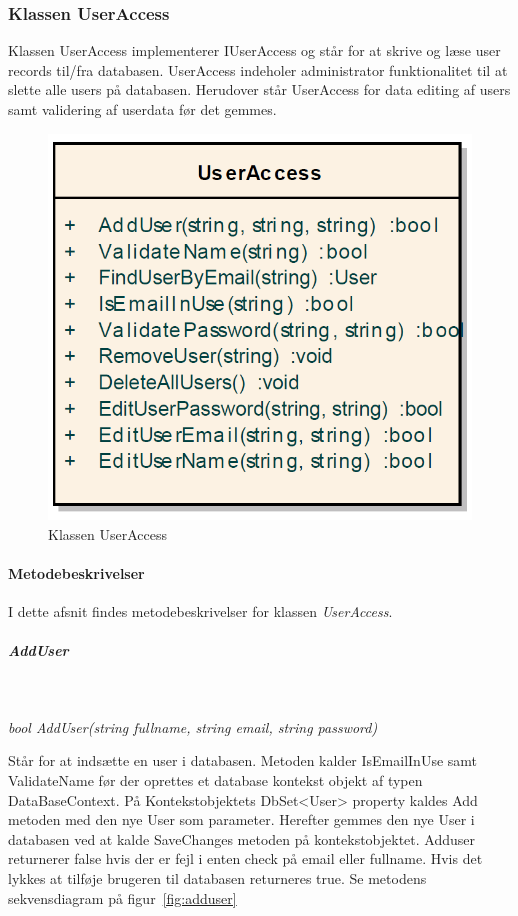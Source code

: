 \subsubsection{Klassen UserAccess}
Klassen UserAccess implementerer IUserAccess og står for at skrive og læse user records til/fra databasen.
UserAccess indeholer administrator funktionalitet til at slette alle users på databasen. Herudover står UserAccess for data editing af users samt validering af userdata før det gemmes.

\begin{figure}
\centering
\includegraphics[width=0.4\linewidth]{figs/implementering/UserAccessClass.PNG}
\caption{Klassen UserAccess}
\label{fig:UserAccessClass}
\end{figure}


\paragraph{Metodebeskrivelser}
I dette afsnit findes metodebeskrivelser for klassen \textit{UserAccess}.

\subparagraph{AddUser}\

\textit{bool AddUser(string fullname, string email, string password)}

Står for at indsætte en user i databasen. Metoden kalder IsEmailInUse samt ValidateName før der oprettes et database kontekst objekt af typen DataBaseContext. På Kontekstobjektets DbSet<User> property kaldes Add metoden med den nye User som parameter. Herefter gemmes den nye User i databasen ved at kalde SaveChanges metoden på kontekstobjektet. Adduser returnerer false hvis der er fejl i enten check på email eller fullname. Hvis det lykkes at tilføje brugeren til databasen returneres true. Se metodens sekvensdiagram på figur~\ref{fig:adduser}

